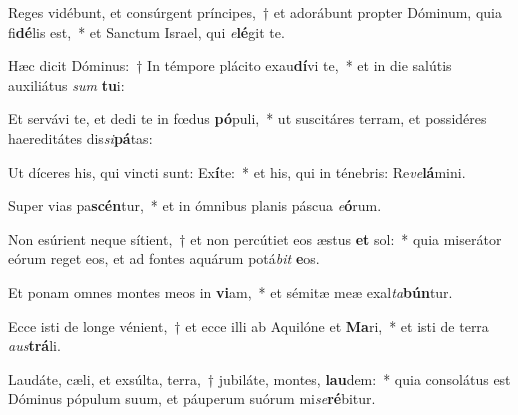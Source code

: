 \item Reges vidébunt, et consúrgent príncipes,~† et adorábunt propter Dóminum, quia fi\textbf{dé}lis est,~* et Sanctum Israel, qui \textit{e}\textbf{lé}git te.
\item Hæc dicit Dóminus:~† In témpore plácito exau\textbf{dí}vi te,~* et in die salútis auxiliátus \textit{sum} \textbf{tu}i:
\item Et servávi te, et dedi te in fœdus \textbf{pó}puli,~* ut suscitáres terram, et possidéres haereditátes dis\textit{si}\textbf{pá}tas:
\item Ut díceres his, qui vincti sunt: Ex\textbf{í}te:~* et his, qui in ténebris: Re\textit{ve}\textbf{lá}mini.
\item Super vias pa\textbf{scén}tur,~* et in ómnibus planis páscua \textit{e}\textbf{ó}rum.
\item Non esúrient neque sítient,~† et non percútiet eos æstus \textbf{et} sol:~* quia miserátor eórum reget eos, et ad fontes aquárum potá\textit{bit} \textbf{e}os.
\item Et ponam omnes montes meos in \textbf{vi}am,~* et sémitæ meæ exal\textit{ta}\textbf{bún}tur.
\item Ecce isti de longe vénient,~† et ecce illi ab Aquilóne et \textbf{Ma}ri,~* et isti de terra \textit{aus}\textbf{trá}li.
\item Laudáte, cæli, et exsúlta, terra,~† jubiláte, montes, \textbf{lau}dem:~* quia consolátus est Dóminus pópulum suum, et páuperum suórum mi\textit{se}\textbf{ré}bitur.
